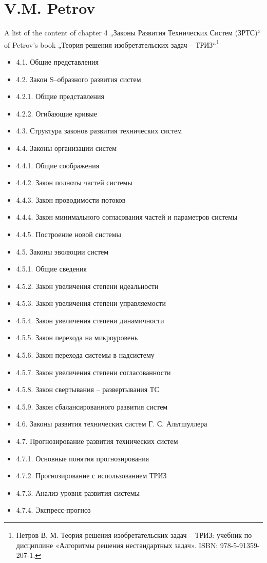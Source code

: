 \documentclass[11pt,a4paper]{article}
\begin{document}
\section*{V.M. Petrov}

A list of the content of chapter 4 „Законы Развития Технических Систем (ЗРТС)“
of Petrov's book „Теория решения изобретательских задач –
ТРИЗ“\footnote{Петров В. М. Теория решения изобретательских задач – ТРИЗ:
  учебник по дисциплине «Алгоритмы решения нестандартных задач». ISBN:
  978-5-91359-207-1. }
\begin{itemize}\itemsep0pt
\item[] 4.1. Общие представления
\item[] 4.2. Закон S–образного развития систем
\item[] 4.2.1. Общие представления
\item[] 4.2.2. Огибающие кривые
\item[] 4.3. Структура законов развития технических систем
\item[] 4.4. Законы организации систем
\item[] 4.4.1. Общие соображения
\item[] 4.4.2. Закон полноты частей системы
\item[] 4.4.3. Закон проводимости потоков
\item[] 4.4.4. Закон минимального согласования частей и параметров системы
\item[] 4.4.5. Построение новой системы
\item[] 4.5. Законы эволюции систем
\item[] 4.5.1. Общие сведения
\item[] 4.5.2. Закон увеличения степени идеальности
\item[] 4.5.3. Закон увеличения степени управляемости
\item[] 4.5.4. Закон увеличения степени динамичности
\item[] 4.5.5. Закон перехода на микроуровень
\item[] 4.5.6. Закон перехода системы в надсистему
\item[] 4.5.7. Закон увеличения степени согласованности
\item[] 4.5.8. Закон свертывания – развертывания ТС
\item[] 4.5.9. Закон сбалансированного развития систем
\item[] 4.6. Законы развития технических систем Г. С. Альтшуллера
\item[] 4.7. Прогнозирование развития технических систем
\item[] 4.7.1. Основные понятия прогнозирования
\item[] 4.7.2. Прогнозирование с использованием ТРИЗ
\item[] 4.7.3. Анализ уровня развития системы
\item[] 4.7.4. Экспресс-прогноз
\end{itemize}
\end{document}
